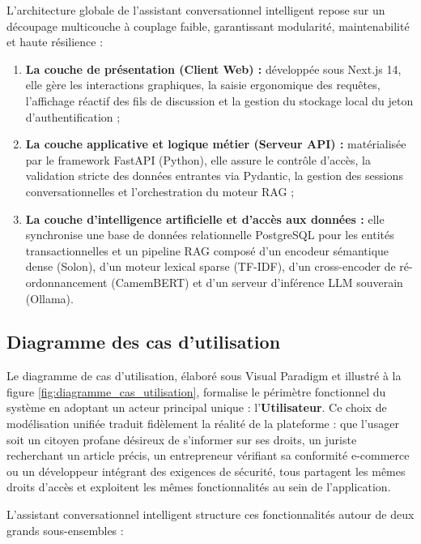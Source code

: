 L'architecture globale de l'assistant conversationnel intelligent repose sur un découpage multicouche à couplage faible, garantissant modularité, maintenabilité et haute résilience :
\begin{enumerate}
    \item \textbf{La couche de présentation (Client Web) :} développée sous Next.js 14, elle gère les interactions graphiques, la saisie ergonomique des requêtes, l'affichage réactif des fils de discussion et la gestion du stockage local du jeton d'authentification ;
    
    \item \textbf{La couche applicative et logique métier (Serveur API) :} matérialisée par le framework FastAPI (Python), elle assure le contrôle d'accès, la validation stricte des données entrantes via Pydantic, la gestion des sessions conversationnelles et l'orchestration du moteur RAG ;
    
    \item \textbf{La couche d'intelligence artificielle et d'accès aux données :} elle synchronise une base de données relationnelle PostgreSQL pour les entités transactionnelles et un pipeline RAG composé d'un encodeur sémantique dense (Solon), d'un moteur lexical sparse (TF-IDF), d'un cross-encoder de ré-ordonnancement (CamemBERT) et d'un serveur d'inférence LLM souverain (Ollama).
\end{enumerate}

\subsection{Diagramme des cas d'utilisation}

Le diagramme de cas d'utilisation, élaboré sous Visual Paradigm et illustré à la figure \ref{fig:diagramme_cas_utilisation}, formalise le périmètre fonctionnel du système en adoptant un acteur principal unique : l'\textbf{Utilisateur}. Ce choix de modélisation unifiée traduit fidèlement la réalité de la plateforme : que l'usager soit un citoyen profane désireux de s'informer sur ses droits, un juriste recherchant un article précis, un entrepreneur vérifiant sa conformité e-commerce ou un développeur intégrant des exigences de sécurité, tous partagent les mêmes droits d'accès et exploitent les mêmes fonctionnalités au sein de l'application.

L'assistant conversationnel intelligent structure ces fonctionnalités autour de deux grands sous-ensembles :

